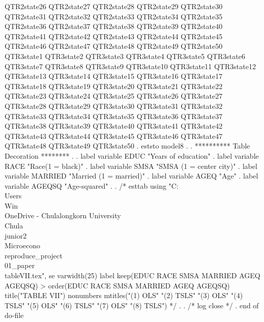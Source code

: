                QTR2state26 QTR2state27 QTR2state28 QTR2state29 QTR2state30
               QTR2state31 QTR2state32 QTR2state33 QTR2state34 QTR2state35
               QTR2state36 QTR2state37 QTR2state38 QTR2state39 QTR2state40
               QTR2state41 QTR2state42 QTR2state43 QTR2state44 QTR2state45
               QTR2state46 QTR2state47 QTR2state48 QTR2state49 QTR2state50
               QTR3state1 QTR3state2 QTR3state3 QTR3state4 QTR3state5
               QTR3state6 QTR3state7 QTR3state8 QTR3state9 QTR3state10
               QTR3state11 QTR3state12 QTR3state13 QTR3state14 QTR3state15
               QTR3state16 QTR3state17 QTR3state18 QTR3state19 QTR3state20
               QTR3state21 QTR3state22 QTR3state23 QTR3state24 QTR3state25
               QTR3state26 QTR3state27 QTR3state28 QTR3state29 QTR3state30
               QTR3state31 QTR3state32 QTR3state33 QTR3state34 QTR3state35
               QTR3state36 QTR3state37 QTR3state38 QTR3state39 QTR3state40
               QTR3state41 QTR3state42 QTR3state43 QTR3state44 QTR3state45
               QTR3state46 QTR3state47 QTR3state48 QTR3state49 QTR3state50
{\smallskip}
. eststo model8
{\smallskip}
. 
. **********  Table Decoration ********
. 
. label variable EDUC   "Years of education"
{\smallskip}
. label variable RACE   "Race(1 = black)"
{\smallskip}
. label variable SMSA   "SMSA (1 = center city)"
{\smallskip}
. label variable MARRIED   "Married (1 = married)"
{\smallskip}
. label variable AGEQ   "Age"
{\smallskip}
. label variable AGEQSQ   "Age-squared"
{\smallskip}
. 
. /* esttab using "C:\\Users\\Win\\OneDrive - Chulalongkorn University\\Chula\\junior2\\Microecono\\reproduce_project\\01_paper\\tableVII.tex", se varwidth(25) label keep(EDUC RACE SMSA MARRIED AGEQ AGEQSQ) 
> order(EDUC RACE SMSA MARRIED AGEQ AGEQSQ) title("TABLE VII") nonumbers mtitles("(1) OLS" "(2) TSLS" "(3) OLS" "(4) TSLS" "(5) OLS" "(6) TSLS" "(7) OLS" "(8) TSLS") */
. 
. /* log close */
. 
end of do-file
{\smallskip}

